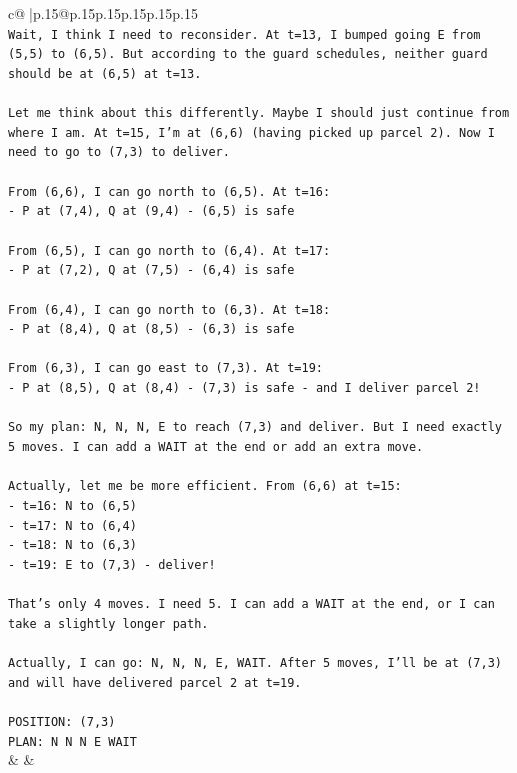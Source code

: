 \documentclass{article}
\begin{document}
{\begin{supertabular}{c@{$\;$}|p{.15\linewidth}@{}p{.15\linewidth}p{.15\linewidth}p{.15\linewidth}p{.15\linewidth}p{.15\linewidth}}
{{{\\ 
\texttt{Wait, I think I need to reconsider. At t=13, I bumped going E from (5,5) to (6,5). But according to the guard schedules, neither guard should be at (6,5) at t=13.} \\
\\ 
\texttt{Let me think about this differently. Maybe I should just continue from where I am. At t=15, I'm at (6,6) (having picked up parcel 2). Now I need to go to (7,3) to deliver.} \\
\\ 
\texttt{From (6,6), I can go north to (6,5). At t=16:} \\
\texttt{{-} P at (7,4), Q at (9,4) {-} (6,5) is safe} \\
\\ 
\texttt{From (6,5), I can go north to (6,4). At t=17:} \\
\texttt{{-} P at (7,2), Q at (7,5) {-} (6,4) is safe} \\
\\ 
\texttt{From (6,4), I can go north to (6,3). At t=18:} \\
\texttt{{-} P at (8,4), Q at (8,5) {-} (6,3) is safe} \\
\\ 
\texttt{From (6,3), I can go east to (7,3). At t=19:} \\
\texttt{{-} P at (8,5), Q at (8,4) {-} (7,3) is safe {-} and I deliver parcel 2!} \\
\\ 
\texttt{So my plan: N, N, N, E to reach (7,3) and deliver. But I need exactly 5 moves. I can add a WAIT at the end or add an extra move.} \\
\\ 
\texttt{Actually, let me be more efficient. From (6,6) at t=15:} \\
\texttt{{-} t=16: N to (6,5)} \\
\texttt{{-} t=17: N to (6,4)} \\
\texttt{{-} t=18: N to (6,3)} \\
\texttt{{-} t=19: E to (7,3) {-} deliver!} \\
\\ 
\texttt{That's only 4 moves. I need 5. I can add a WAIT at the end, or I can take a slightly longer path.} \\
\\ 
\texttt{Actually, I can go: N, N, N, E, WAIT. After 5 moves, I'll be at (7,3) and will have delivered parcel 2 at t=19.} \\
\\ 
\texttt{POSITION: (7,3)} \\
\texttt{PLAN: N N N E WAIT} \\
            }
        }
    }
    & & \\ \\


\end{supertabular}}
\end{document}
